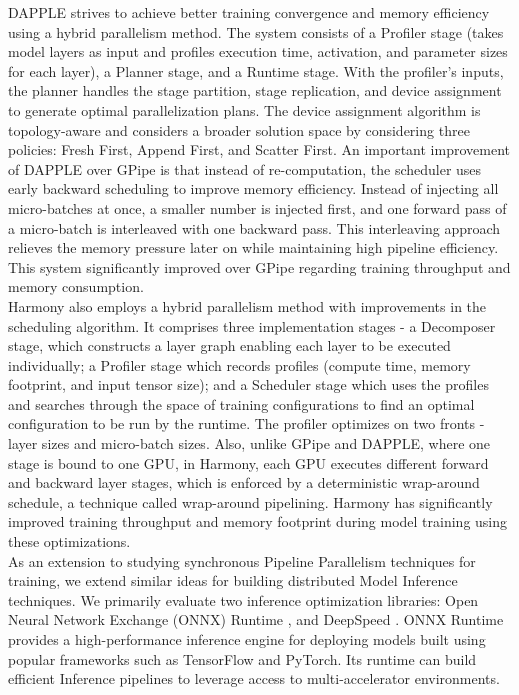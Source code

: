 \documentclass[conference]{IEEEtran}
\begin{document}
DAPPLE \cite{b4} strives to achieve better training convergence and memory efficiency using a hybrid parallelism method. The system consists of a Profiler stage (takes model layers as input and profiles execution time, activation, and parameter sizes for each layer), a Planner stage, and a Runtime stage. With the profiler's inputs, the planner handles the stage partition, stage replication, and device assignment to generate optimal parallelization plans. The device assignment algorithm is topology-aware and considers a broader solution space by considering three policies: Fresh First, Append First, and Scatter First. An important improvement of DAPPLE over GPipe is that instead of re-computation, the scheduler uses early backward scheduling to improve memory efficiency. Instead of injecting all micro-batches at once, a smaller number is injected first, and one forward pass of a micro-batch is interleaved with one backward pass. This interleaving approach relieves the memory pressure later on while maintaining high pipeline efficiency. This system significantly improved over GPipe regarding training throughput and memory consumption. \\

Harmony \cite{b5} also employs a hybrid parallelism method with improvements in the scheduling algorithm. It comprises three implementation stages - a Decomposer stage, which constructs a layer graph enabling each layer to be executed individually; a Profiler stage which records profiles (compute time, memory footprint, and input tensor size); and a Scheduler stage which uses the profiles and searches through the space of training configurations to find an optimal configuration to be run by the runtime. The profiler optimizes on two fronts - layer sizes and micro-batch sizes. Also, unlike GPipe and DAPPLE, where one stage is bound to one GPU, in Harmony, each GPU executes different forward and backward layer stages, which is enforced by a deterministic wrap-around schedule, a technique called wrap-around pipelining. Harmony has significantly improved training throughput and memory footprint during model training using these optimizations. \\

As an extension to studying synchronous Pipeline Parallelism techniques for training, we extend similar ideas for building distributed Model Inference techniques. We primarily evaluate two inference optimization libraries: Open Neural Network Exchange (ONNX) Runtime \cite{b6}, and DeepSpeed \cite{b7}. ONNX Runtime provides a high-performance inference engine for deploying models built using popular frameworks such as TensorFlow and PyTorch. Its runtime can build efficient Inference pipelines to leverage access to multi-accelerator environments. \\
\end{document}
